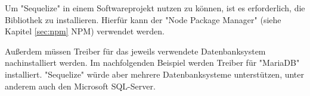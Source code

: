
Um "Sequelize" in einem Softwareprojekt nutzen zu können, ist es erforderlich, die Bibliothek zu installieren. Hierfür kann der "Node Package Manager" (siehe Kapitel \ref{sec:npm} NPM) verwendet werden.


\cite{Sequelize}

Außerdem müssen Treiber für das jeweils verwendete Datenbanksystem nachinstalliert werden. Im nachfolgenden Beispiel werden Treiber für "MariaDB" installiert. "Sequelize" würde aber mehrere Datenbanksysteme unterstützen, unter anderem auch den Microsoft SQL-Server.


\cite{SequInstall}
